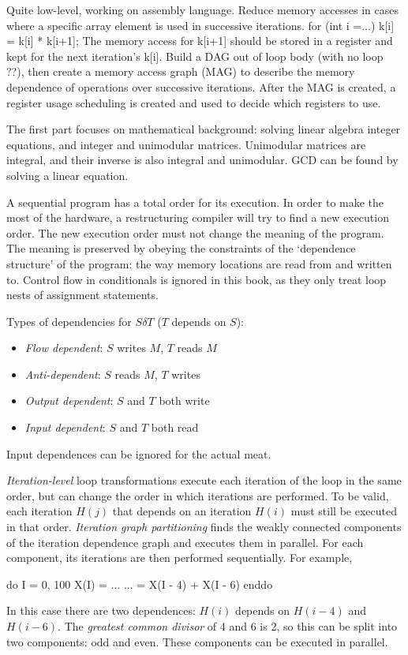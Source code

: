
Quite low-level, working on assembly language.
Reduce memory accesses in cases where a specific array element is used in successive iterations.
  for (int i =...)
    k[i] = k[i] * k[i+1];
The memory access for k[i+1] should be stored in a register and kept for the next iteration's k[i].
Build a DAG out of loop body (with no loop ??), then create a memory access graph (MAG) to describe the memory dependence of operations over successive iterations.
After the MAG is created, a register usage scheduling is created and used to decide which registers to use.


The first part focuses on mathematical background: solving linear algebra integer equations, and integer and unimodular matrices.
Unimodular matrices are integral, and their inverse is also integral and unimodular. GCD can be found by solving a linear equation.

A sequential program has a total order for its execution. In order to make the most of the hardware, a restructuring compiler
will try to find a new execution order. The new execution order must not change the meaning of the program.
The meaning is preserved by obeying the constraints of the `dependence structure' of the program:
the way memory locations are read from and written to.
Control flow in conditionals is ignored in this book, as they only treat loop nests of assignment statements.

Types of dependencies for $S \delta T$ ($T$ depends on $S$):
\begin{itemize}
\item \emph{Flow dependent}: $S$ writes $M$, $T$ reads $M$
\item \emph{Anti-dependent}: $S$ reads $M$, $T$ writes
\item \emph{Output dependent}: $S$ and $T$ both write
\item \emph{Input dependent}: $S$ and $T$ both read
\end{itemize}

Input dependences can be ignored for the actual meat.

\emph{Iteration-level} loop transformations execute each iteration of the loop in the same order, but can change the order in which iterations are performed.
To be valid, each iteration $H(j)$ that depends on an iteration $H(i)$ must still be executed in that order.
\emph{Iteration graph partitioning} finds the weakly connected components of the iteration dependence graph and executes them in parallel. For each component, its iterations are then performed sequentially.
For example,
\begin{code}
do I = 0, 100
    X(I) = ...
    ...  = X(I - 4) + X(I - 6)
enddo
\end{code}
In this case there are two dependences: $H(i)$ depends on $H(i-4)$ and $H(i-6)$.
The \emph{greatest common divisor} of 4 and 6 is 2, so this can be split into two components: odd and even.
These components can be executed in parallel.

